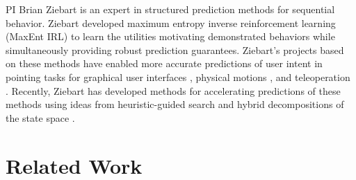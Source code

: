 \documentclass[letterpaper, 11 pt, onecolumn]{article}
\begin{document}
PI Brian Ziebart is an expert in structured prediction methods for sequential behavior.  Ziebart developed maximum entropy inverse reinforcement learning (MaxEnt IRL) \cite{ziebart2008maximum,ziebart2010modeling} to learn the utilities motivating demonstrated behaviors while simultaneously providing robust prediction guarantees. 
Ziebart's projects based on these methods have enabled more accurate predictions of user intent in pointing tasks for graphical user interfaces \cite{ziebart2012probabilistic}, physical motions \cite{monfort2015intent}, and teleoperation \cite{schultz2017goal}.
Recently, Ziebart has developed methods for accelerating predictions of these methods using ideas from heuristic-guided search \cite{monfort2015softstar} and hybrid decompositions of the state space \cite{byravan2015graph}.


\section{Related Work}\label{sec:related}




\end{document}
